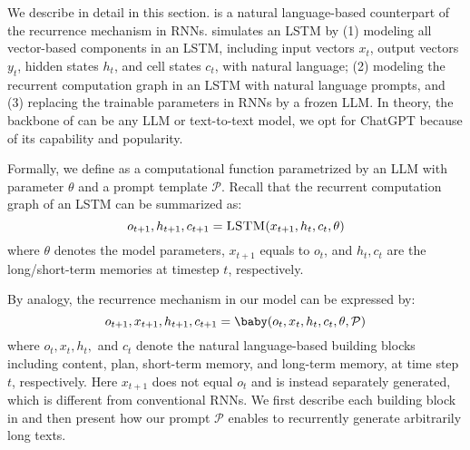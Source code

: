 \section{\baby}

We describe \baby in detail in this section. \baby is a natural language-based counterpart of the recurrence mechanism in RNNs. \baby simulates an LSTM by (1) modeling all vector-based components in an LSTM, including input vectors $x_t$, output vectors $y_t$, hidden states $h_t$, and cell states $c_t$, with natural language; (2) modeling the recurrent computation graph in an LSTM with natural language prompts, and (3) replacing the trainable parameters in RNNs by a frozen LLM. In theory, the backbone of \baby can be any LLM or text-to-text model, we opt for ChatGPT because of its capability and popularity.

Formally, we define \baby as a computational function parametrized by an LLM with parameter $\theta$ and a prompt template $\mathcal{P}$. Recall that the recurrent computation graph of an LSTM can be summarized as:
\begin{equation}
    o_{t+1}, h_{t+1}, c_{t+1} = \textsc{LSTM}(x_{t+1}, h_{t}, c_{t}, \theta)
\end{equation}
where $\theta$ denotes the model parameters, $x_{t+1}$ equals to $o_{t}$, and $h_{t}, c_{t}$ are the long/short-term memories at timestep $t$, respectively. 

By analogy, the recurrence mechanism in our model can be expressed by:
\begin{equation}
    o_{t+1}, x_{t+1}, h_{t+1}, c_{t+1} = \baby(o_{t}, x_{t}, h_{t}, c_{t}, \theta, \mathcal{P})
\end{equation}
where $o_{t}, x_{t}, h_{t},$ and $c_{t}$ denote the natural language-based building blocks including content, plan, short-term memory, and long-term memory, at time step $t$, respectively. Here $x_{t+1}$ does not equal $o_{t}$ and is instead separately generated, which is different from conventional RNNs.
We first describe each building block in \baby and then present how our prompt $\mathcal{P}$ enables \baby to recurrently generate arbitrarily long texts.




